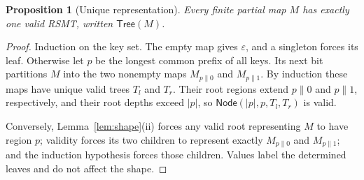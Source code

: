 \documentclass[11pt]{article}
\newtheorem{proposition}{Proposition}
\begin{document}
\begin{proposition}[Unique representation]
\label{prop:unique}
Every finite partial map $M$ has exactly one valid RSMT, written $\mathsf{Tree}(M)$.
\end{proposition}
\begin{proof}
Induction on the key set. The empty map gives $\varepsilon$, and a singleton forces its leaf. Otherwise let $p$ be the longest common prefix of all keys. Its next bit partitions $M$ into the two nonempty maps $M_{p\|0}$ and $M_{p\|1}$. By induction these maps have unique valid trees $T_l$ and $T_r$. Their root regions extend $p\|0$ and $p\|1$, respectively, and their root depths exceed $|p|$, so $\mathsf{Node}(|p|,p,T_l,T_r)$ is valid.

Conversely, Lemma~\ref{lem:shape}(ii) forces any valid root representing $M$ to have region $p$; validity forces its two children to represent exactly $M_{p\|0}$ and $M_{p\|1}$; and the induction hypothesis forces those children. Values label the determined leaves and do not affect the shape.
\end{proof}
\end{document}
